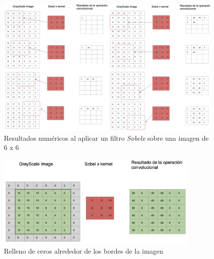 \begin{onehalfspacing}
\begin{figure}[th]
	\centering
	\includegraphics[width=17cm,keepaspectratio]{XX_Figures/Fig_Ejemplo_Sobelx.png}
	\caption{\footnotesize Resultados numéricos al aplicar un filtro \textit{Sobelx} sobre una imagen de 6 x 6}
	\label{fig:Fig_Ejemplo_Sobelx}
\end{figure}

\begin{figure}[th]
	\centering
	\includegraphics[width=10cm,keepaspectratio]{XX_Figures/Fig_Sobel_padding.png}
	\caption{\footnotesize Relleno de ceros alrededor de los bordes de la imagen}
	\label{fig:Fig_Sobel_padding}
\end{figure}


\end{onehalfspacing}

